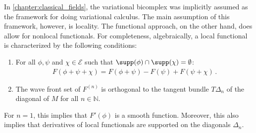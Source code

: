     \begin{remark}
        In \cref{chapter:classical_fields}, the variational bicomplex was implicitly assumed as the framework for doing variational calculus. The main assumption of this framework, however, is locality. The functional approach, on the other hand, does allow for nonlocal functionals. For completeness, algebraically, a local functional is characterized by the following conditions:
        \begin{enumerate}
            \item For all $\phi,\psi$ and $\chi\in\mathcal{E}$ such that $\supp(\phi)\cap\supp(\chi)=\emptyset$:
                \begin{gather}
                    F(\phi+\psi+\chi)=F(\phi+\psi)-F(\psi)+F(\psi+\chi)\,.
                \end{gather}
            \item The wave front set of $F^{(n)}$ is orthogonal to the tangent bundle $T\Delta_n$ of the diagonal of $M$ for all $n\in\mathbb{N}$.
        \end{enumerate}
        For $n=1$, this implies that $F'(\phi)$ is a smooth function. Moreover, this also implies that derivatives of local functionals are supported on the diagonals $\Delta_n$.
    \end{remark}

